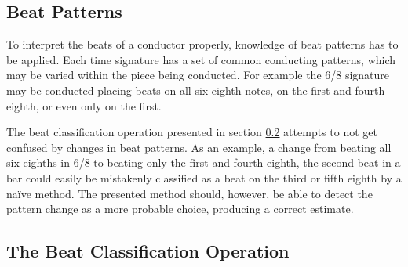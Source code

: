 \subsection{Beat Patterns}

To interpret the beats of a conductor properly,
knowledge of beat patterns has to be applied.
Each time signature has a set of common conducting patterns,
which may be varied within the piece being conducted.
For example the 6/8 signature may be conducted
placing beats on
all six eighth notes,
on the first and fourth eighth,
or even only on the first.

The beat classification operation presented
in section \ref{sec:beat_classification_op}
attempts to not get confused by changes in beat patterns.
As an example, a change from beating all six eighths in 6/8
to beating only the first and fourth eighth,
the second beat in a bar could easily be mistakenly classified
as a beat on the third or fifth eighth
by a na\"ive method.
The presented method should, however,
be able to detect the pattern change as
a more probable choice,
producing a correct estimate.

\subsection{The Beat Classification Operation}
\label{sec:beat_classification_op}

